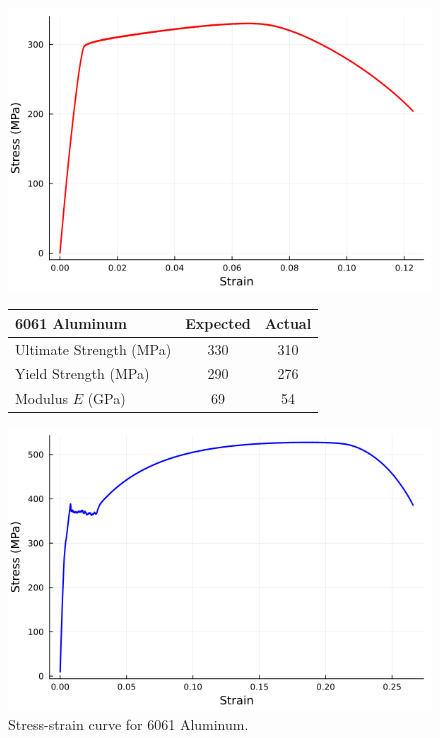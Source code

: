 \documentclass[conf]{new-aiaa} %
\begin{document}
\begin{figure}[h!]
\centering

\begin{minipage}{0.48\textwidth}
    \centering
    \includegraphics[width=\linewidth]{aluminum_plot.png}
    \caption{Stress-strain curve for 6061 Aluminum.}
    \label{fig:aluminum}
    \vspace{2em}
    \renewcommand{\arraystretch}{1.3}
    \begin{tabular}{lcc}
    \toprule
    \textbf{6061 Aluminum} & Expected & Actual \\
    \midrule
    Ultimate Strength (MPa) & 330 & 310 \\ 
    Yield Strength (MPa)    & 290 & 276 \\ 
    Modulus $E$ (GPa)       & 69  & 54 \\ 
    \bottomrule
    \end{tabular}
    \label{tab:aluminum}
\end{minipage}
\hfill
\begin{minipage}{0.48\textwidth}
    \centering
    \includegraphics[width=\linewidth]{steel_plot.png}

\end{minipage}
\end{figure}
\end{document}
